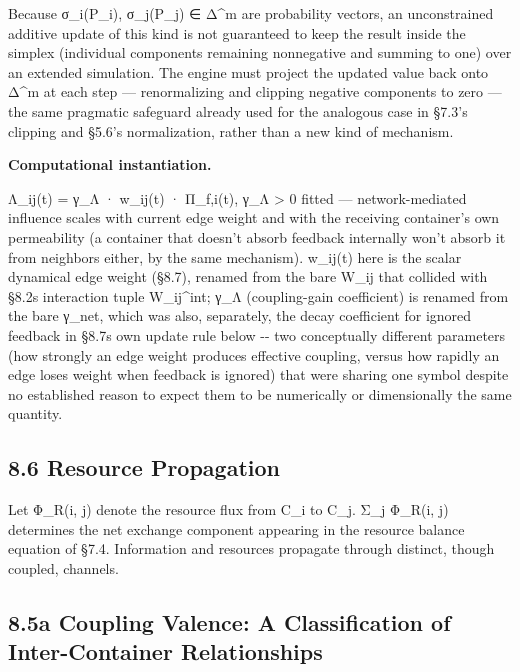 \documentclass[
]{article}
\begin{document}
Because σ\_i(P\_i), σ\_j(P\_j) ∈ Δ\^{}m are probability vectors, an
unconstrained additive update of this kind is not guaranteed to keep the
result inside the simplex (individual components remaining nonnegative
and summing to one) over an extended simulation. The engine must project
the updated value back onto Δ\^{}m at each step --- renormalizing and
clipping negative components to zero --- the same pragmatic safeguard
already used for the analogous case in §7.3's clipping and §5.6's
normalization, rather than a new kind of mechanism.

\textbf{Computational instantiation.}

Λ\_ij(t) = γ\_Λ · w\_ij(t) · Π\_f,i(t), γ\_Λ \textgreater{} 0 fitted ---
network-mediated influence scales with current edge weight and with the
receiving container's own permeability (a container that doesn't absorb
feedback internally won't absorb it from neighbors either, by the same
mechanism). w\_ij(t) here is the scalar dynamical edge weight (§8.7),
renamed from the bare W\_ij that collided with §8.2\textquotesingle s
interaction tuple W\_ij\^{}int; γ\_Λ (coupling-gain coefficient) is
renamed from the bare γ\_net, which was also, separately, the decay
coefficient for ignored feedback in §8.7\textquotesingle s own update
rule below -\/- two conceptually different parameters (how strongly an
edge weight produces effective coupling, versus how rapidly an edge
loses weight when feedback is ignored) that were sharing one symbol
despite no established reason to expect them to be numerically or
dimensionally the same quantity.

\hypertarget{resource-propagation}{%
\subsection{8.6 Resource Propagation}\label{resource-propagation}}

Let Φ\_R(i, j) denote the resource flux from C\_i to C\_j. Σ\_j Φ\_R(i,
j) determines the net exchange component appearing in the resource
balance equation of §7.4. Information and resources propagate through
distinct, though coupled, channels.

\hypertarget{a-coupling-valence-a-classification-of-inter-container-relationships}{%
\subsection{8.5a Coupling Valence: A Classification of Inter-Container
Relationships}\label{a-coupling-valence-a-classification-of-inter-container-relationships}}
\end{document}
